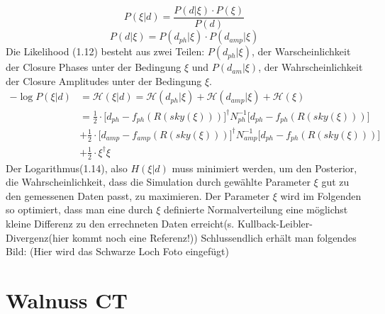 \documentclass[]{dsadokumentation}
\begin{document}
\begin{equation}
P(\xi|d)= \frac {P(d|\xi)\cdot P(\xi)}{ P(d) }
\end{equation}
\begin{equation}
P(d|\xi)=  {P(d_{ph}|\xi)\cdot P(d_{amp}|\xi)}    
\end{equation}
Die Likelihood (1.12) besteht aus zwei Teilen: $P(d_{ph}|\xi)$, der Warscheinlichkeit der Closure Phases unter der Bedingung $\xi$ und $P(d_{am}| \xi)$, der Wahrscheinlichkeit der Closure Amplitudes unter der Bedingung $\xi$.
\begin{align}
 -\log {P(\xi|d)} &=
 \mathcal{H} (\xi|d) = \mathcal{H} (d_{ph}|\xi)+\mathcal{H} (d_{amp}|\xi)+\mathcal{H} (\xi) \\
&= \frac {1}{2}\cdot \Bigg[d_{ph} - f_{ph}(R(sky(\xi))) \Bigg]^\dagger N^{-1}_{ph} \Bigg[d_{ph} - f_{ph}(R(sky(\xi))) \Bigg]  
\\  & + \frac {1}{2}\cdot \Bigg[d_{amp} - f_{amp}(R(sky(\xi))) \Bigg]^\dagger N_{amp}^{-1}\Bigg[d_{ph} - f_{ph}(R(sky(\xi))) \Bigg]
\\ & +  \frac {1}{2} \cdot \xi^\dagger \xi
\end{align}
Der Logarithmus(1.14), also $H(\xi|d)$ muss minimiert werden, um den Posterior, die Wahrscheinlichkeit, dass die Simulation durch gewählte Parameter $\xi$ gut zu den gemessenen Daten passt, zu maximieren.
Der Parameter $\xi$ wird im Folgenden so optimiert, dass man eine durch $\xi$ definierte Normalverteilung eine möglichst kleine Differenz zu den errechneten Daten erreicht(s. Kullback-Leibler-Divergenz(hier kommt noch eine Referenz!)) %
Schlussendlich erhält man folgendes Bild:
(Hier wird das Schwarze Loch Foto eingefügt)



\section{Walnuss CT}\label{k4.2.ch.walnussct}
\end{document}
